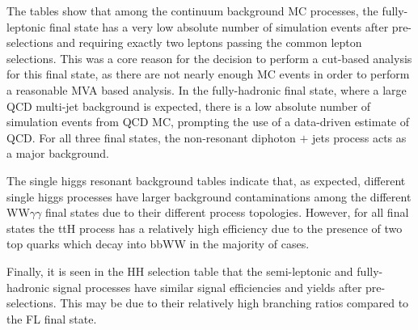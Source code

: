 \begin{figure}[H]
    \label{tab:HH_Yield_Table}
\end{figure}


The tables show that among the continuum background MC processes, the fully-leptonic final state has a very low absolute number of simulation events after pre-selections and requiring exactly two leptons passing the common lepton selections. This was a core reason for the decision to perform a cut-based analysis for this final state, as there are not nearly enough MC events in order to perform a reasonable MVA based analysis. In the fully-hadronic final state, where a large QCD multi-jet background is expected, there is a low absolute number of simulation events from QCD MC, prompting the use of a data-driven estimate of QCD. For all three final states, the non-resonant diphoton $+$ jets process acts as a major background. 

The single higgs resonant background tables indicate that, as expected, different single higgs processes have larger background contaminations among the different WW$\gamma\gamma$ final states due to their different process topologies. However, for all final states the ttH process has a relatively high efficiency due to the presence of two top quarks which decay into bbWW in the majority of cases. 

Finally, it is seen in the HH selection table that the semi-leptonic and fully-hadronic signal processes have similar signal efficiencies and yields after pre-selections. This may be due to their relatively high branching ratios compared to the FL final state. 